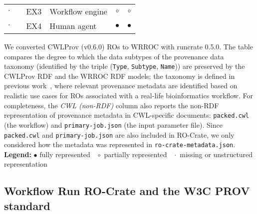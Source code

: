 \begin{table}[ht]
\begin{tabular}{c|r|l|l|c|c}
$\cdot$ & & EX3 & Workflow engine         & $\circ$ & $\circ$  \\  
$\cdot$ & & EX4 & Human agent             & $\bullet$ & $\bullet$  \\ \hline
\end{tabular}
\begin{flushleft}
  We converted CWLProv (v0.6.0) ROs to WRROC with runcrate 0.5.0. The table compares the
  degree to which the data subtypes of the provenance data taxonomy
  (identified by the triple (\texttt{Type}, \texttt{Subtype}, \texttt{Name})) are preserved
  by the CWLProv RDF and the WRROC RDF models; the taxonomy is defined in previous work~\cite{De Wit 2022},
  where relevant provenance metadata are identified based on realistic
  use cases for ROs associated with a real-life bioinformatics workflow.
%
For completeness, the \emph{CWL (non-RDF)} column also reports the non-RDF representation of provenance metadata
in CWL-specific documents: \texttt{packed.cwl} (the workflow) and \texttt{primary-job.json} (the input parameter file).
%
Since \texttt{packed.cwl} and \texttt{primary-job.json} are also included in RO-Crate, we only considered how the metadata was represented in \texttt{ro-crate-metadata.json}. \\
\textbf{Legend:} $\bullet$ fully represented  $\;\;\circ$ partially represented   $\;\;\cdot$ missing or unstructured representation 
\end{flushleft}
\label{wrroc:analysis_table}
\end{table}

\subsection{Workflow Run RO-Crate and the W3C PROV standard}

